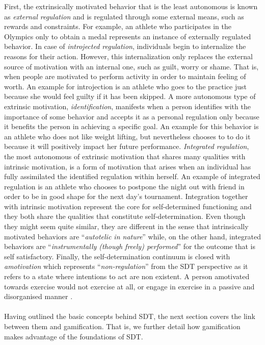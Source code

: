 First, the extrinsically motivated behavior that is the least autonomous is known as \textit{external regulation} and is regulated through some external means, such as rewards and constraints. For example, an athlete who participates in the Olympics only to obtain a medal represents an instance of externally regulated behavior. In case of \textit{introjected regulation}, individuals begin to internalize the reasons for their action. However, this internalization only replaces the external source of motivation with an internal one, such as guilt, worry or shame. That is, when people are motivated to perform activity in order to maintain feeling of worth. An example for introjection is an athlete who goes to the practice just because she would feel guilty if it has been skipped. A more autonomous type of extrinsic motivation, \textit{identification}, manifests when a person identifies with the importance of some behavior and accepts it as a personal regulation only because it benefits the person in achieving a specific goal. An example for this behavior is an athlete who does not like weight lifting, but nevertheless chooses to to do it because it will positively impact her future performance. \textit{Integrated regulation}, the most autonomous of extrinsic motivation that shares many qualities with intrinsic motivation, is a form of motivation that arises when an individual has fully assimilated the identified regulation within herself. An example of integrated regulation is an athlete who chooses to postpone the night out with friend in order to be in good shape for the next day's tournament. Integration together with intrinsic motivation represent the core for self-determined functioning and they both share the qualities that constitute self-determination. Even though they might seem quite similar, they are different in the sense that intrinsically motivated behaviors are ``\textit{autotelic in nature}'' while, on the other hand, integrated behaviors are ``\textit{instrumentally (though freely) performed}'' for the outcome that is self satisfactory.  Finally, the self-determination continuum is closed with  \textit{amotivation} which represents ``\textit{non-regulation}'' from the SDT perspective as it refers to a state where intentions to act are non existent. A person amotivated towards exercise would not exercise at all, 
or engage in exercise in a passive and disorganised  manner \cite{deci1994promoting, ryan2000intrinsic, vallerand2007intrinsic}.\\\\
Having outlined the basic concepts behind SDT, the next section covers the link between them and gamification. That is, we further detail how gamification makes advantage of the foundations of SDT.
